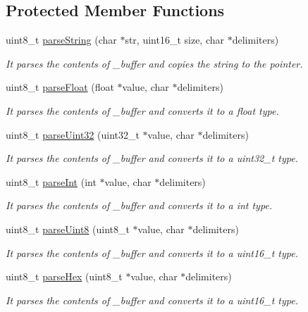 \subsection*{Protected Member Functions}
\begin{DoxyCompactItemize}
\item 
uint8\+\_\+t \hyperlink{class_wasp_u_a_r_t_af0a8ecf0c4e186009b78a556391283de}{parse\+String} (char $\ast$str, uint16\+\_\+t size, char $\ast$delimiters)
\begin{DoxyCompactList}\small\item\em It parses the contents of \+\_\+buffer and copies the string to the pointer. \end{DoxyCompactList}\item 
uint8\+\_\+t \hyperlink{class_wasp_u_a_r_t_aca35e35627f7838183fc9a41ac95a9be}{parse\+Float} (float $\ast$value, char $\ast$delimiters)
\begin{DoxyCompactList}\small\item\em It parses the contents of \+\_\+buffer and converts it to a float type. \end{DoxyCompactList}\item 
uint8\+\_\+t \hyperlink{class_wasp_u_a_r_t_a0b5b341aa38f4b21988b285573c356c4}{parse\+Uint32} (uint32\+\_\+t $\ast$value, char $\ast$delimiters)
\begin{DoxyCompactList}\small\item\em It parses the contents of \+\_\+buffer and converts it to a uint32\+\_\+t type. \end{DoxyCompactList}\item 
uint8\+\_\+t \hyperlink{class_wasp_u_a_r_t_a63de9578e20755a735ff1c7a74bf33f5}{parse\+Int} (int $\ast$value, char $\ast$delimiters)
\begin{DoxyCompactList}\small\item\em It parses the contents of \+\_\+buffer and converts it to a int type. \end{DoxyCompactList}\item 
uint8\+\_\+t \hyperlink{class_wasp_u_a_r_t_a8231a03be27390d0523bd91989bf9505}{parse\+Uint8} (uint8\+\_\+t $\ast$value, char $\ast$delimiters)\hypertarget{class_wasp_u_a_r_t_a8231a03be27390d0523bd91989bf9505}{}\label{class_wasp_u_a_r_t_a8231a03be27390d0523bd91989bf9505}

\begin{DoxyCompactList}\small\item\em It parses the contents of \+\_\+buffer and converts it to a uint16\+\_\+t type. \end{DoxyCompactList}\item 
uint8\+\_\+t \hyperlink{class_wasp_u_a_r_t_aa7f0e25db195e335fb595f52c7c7ca9b}{parse\+Hex} (uint8\+\_\+t $\ast$value, char $\ast$delimiters)\hypertarget{class_wasp_u_a_r_t_aa7f0e25db195e335fb595f52c7c7ca9b}{}\label{class_wasp_u_a_r_t_aa7f0e25db195e335fb595f52c7c7ca9b}

\begin{DoxyCompactList}\small\item\em It parses the contents of \+\_\+buffer and converts it to a uint16\+\_\+t type. \end{DoxyCompactList}\end{DoxyCompactItemize}
